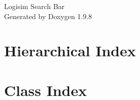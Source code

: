 \documentclass[twoside]{book}
\newcommand{\+}{\discretionary{\mbox{\scriptsize$\hookleftarrow$}}{}{}}
\newcommand{\clearemptydoublepage}{%
    \newpage{\pagestyle{empty}\cleardoublepage}%
  }
\begin{document}
  \raggedbottom
    \hypersetup{pageanchor=false,
                bookmarksnumbered=true,
                pdfencoding=unicode
               }
  \begin{titlepage}
  \vspace*{7cm}
  \begin{center}%
  {\Large Logisim Search Bar}\\
  \vspace*{1cm}
  {\large Generated by Doxygen 1.9.8}\\
  \end{center}
  \end{titlepage}
  \clearemptydoublepage
  \tableofcontents
  \clearemptydoublepage
  \hypersetup{pageanchor=true}
\chapter{Hierarchical Index}

\chapter{Class Index}

\end{document}
